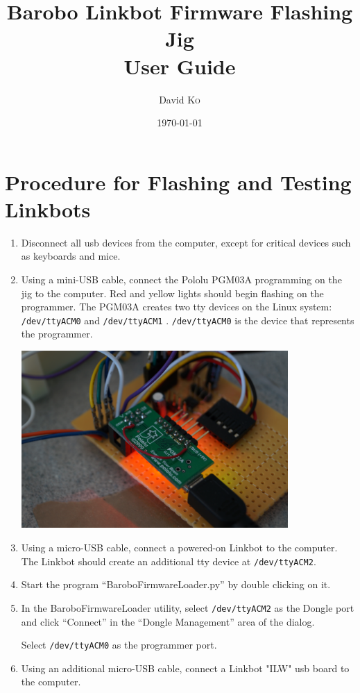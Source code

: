\documentclass{article}
\title{Barobo Linkbot Firmware Flashing Jig \\ User Guide} %
\author{David \textsc{Ko}} %
\date{\today} %
\begin{document}
\maketitle %

\section{Procedure for Flashing and Testing Linkbots}
\begin{enumerate}
\item Disconnect all usb devices from the computer, except for critical devices
   such as keyboards and mice.
\item Using a mini-USB cable, connect the Pololu PGM03A programming on the jig to
   the computer. Red and yellow lights should begin flashing on the programmer.
   The PGM03A creates two tty devices on the Linux system: \texttt{/dev/ttyACM0} and
   \texttt{/dev/ttyACM1} . \texttt{/dev/ttyACM0} is the device that represents the programmer.

   \begin{center}
   \includegraphics[width=4in]{images/programmer.jpg}
   \end{center}

\item Using a micro-USB cable, connect a powered-on Linkbot to the computer. The
   Linkbot should create an additional tty device at \texttt{/dev/ttyACM2}.
\item Start the program ``BaroboFirmwareLoader.py'' by double clicking on it.
\item In the BaroboFirmwareLoader utility, select \texttt{/dev/ttyACM2} as the Dongle
   port and click ``Connect'' in the ``Dongle Management'' area of the dialog. 

   Select \texttt{/dev/ttyACM0} as the programmer port.
\item Using an additional micro-USB cable, connect a Linkbot "ILW" usb board to
   the computer.


\end{enumerate}
\end{document}
